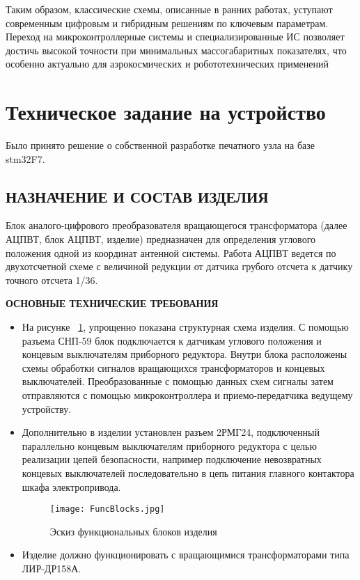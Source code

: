 Таким образом, классические схемы, описанные в ранних работах, уступают современным цифровым и гибридным решениям по ключевым параметрам. 
Переход на микроконтроллерные системы и специализированные ИС позволяет достичь высокой точности при минимальных массогабаритных показателях, 
что особенно актуально для аэрокосмических и робототехнических применений



\section{Техническое задание на устройство}

Было принято решение о собственной разработке печатного узла на базе stm32F7.


\subsection{НАЗНАЧЕНИЕ И СОСТАВ ИЗДЕЛИЯ}

Блок аналого-цифрового преобразователя вращающегося трансформатора (далее АЦПВТ, блок АЦПВТ, изделие) предназначен для определения углового положения одной из координат антенной системы. 
Работа АЦПВТ ведется по двухотсчетной схеме с величиной редукции от датчика грубого отсчета к датчику точного отсчета 1/36.  

\textbf{ОСНОВНЫЕ ТЕХНИЧЕСКИЕ ТРЕБОВАНИЯ}

\begin{itemize}
    \item На рисунке ~\ref{FuncBlocks}, упрощенно показана структурная схема изделия. 
          С помощью разъема СНП-59 блок подключается к датчикам углового положения и концевым выключателям приборного редуктора. 
          Внутри блока расположены схемы обработки сигналов вращающихся трансформаторов и концевых выключателей. 
          Преобразованные с помощью данных схем сигналы затем отправляются с помощью микроконтроллера и приемо-передатчика ведущему устройству.  

    \item Дополнительно в изделии установлен разъем 2РМГ24, подключенный параллельно концевым выключателям приборного редуктора с целью реализации цепей безопасности, 
          например подключение невозвратных концевых выключателей последовательно в цепь питания главного контактора шкафа электропривода. 

        \begin{figure}[!t]
          \centering
          \texttt{[image: FuncBlocks.jpg]} 
          \caption{Эскиз функциональных блоков изделия}
          \label{FuncBlocks}
        \end{figure}

    \item Изделие должно функционировать с вращающимися трансформаторами типа ЛИР-ДР158А.
      \end{itemize}


